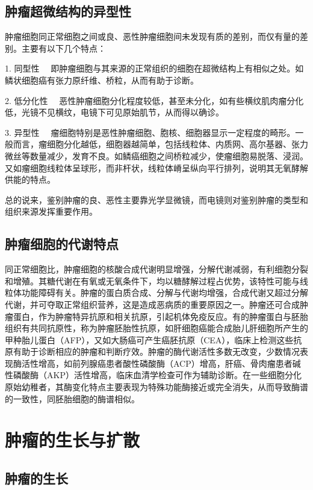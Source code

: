 \subsection{肿瘤超微结构的异型性}

肿瘤细胞同正常细胞之间或良、恶性肿瘤细胞间未发现有质的差别，而仅有量的差别。主要有以下几个特点：

{1. 同型性}
　即肿瘤细胞与其来源的正常组织的细胞在超微结构上有相似之处。如鳞状细胞癌有张力原纤维、桥粒，从而有助于诊断。

{2. 低分化性}
　恶性肿瘤细胞分化程度较低，甚至未分化，如有些横纹肌肉瘤分化低，光镜不见横纹，电镜下可见原始肌节，从而得以确诊。

{3. 异型性}
　瘤细胞特别是恶性肿瘤细胞、胞核、细胞器显示一定程度的畸形。一般而言，瘤细胞分化越低，细胞器越简单，包括线粒体、内质网、高尔基器、张力微丝等数量减少，发育不良。如鳞癌细胞之间桥粒减少，使瘤细胞易脱落、浸润。又如瘤细胞线粒体呈球形，而非杆状，线粒体嵴呈纵向平行排列，说明其无氧酵解供能的特点。

总的说来，鉴别肿瘤的良、恶性主要靠光学显微镜，而电镜则对鉴别肿瘤的类型和组织来源发挥重要作用。

\subsection{肿瘤细胞的代谢特点}

同正常细胞比，肿瘤细胞的核酸合成代谢明显增强，分解代谢减弱，有利细胞分裂和增殖。其糖代谢在有氧或无氧条件下，均以糖酵解过程占优势，该特性可能与线粒体功能障碍有关。肿瘤的蛋白质合成、分解与代谢均增强，合成代谢又超过分解代谢，并可夺取正常组织营养，这是造成恶病质的重要原因之一。肿瘤还可合成肿瘤蛋白，作为肿瘤特异抗原和相关抗原，引起机体免疫反应。有的肿瘤蛋白与胚胎组织有共同抗原性，称为肿瘤胚胎性抗原，如肝细胞癌能合成胎儿肝细胞所产生的甲种胎儿蛋白（AFP），又如大肠癌可产生癌胚抗原（CEA），临床上检测这些抗原有助于诊断相应的肿瘤和判断疗效。肿瘤的酶代谢活性多数无改变，少数情况表现酶活性增高，如前列腺癌患者酸性磷酸酶（ACP）增高，肝癌、骨肉瘤患者碱性磷酸酶（AKP）活性增高，临床血清学检查可作为辅助诊断。在一些细胞分化原始幼稚者，其酶变化特点主要表现为特殊功能酶接近或完全消失，从而导致酶谱的一致性，同胚胎细胞的酶谱相似。

\section{肿瘤的生长与扩散}

\subsection{肿瘤的生长}

